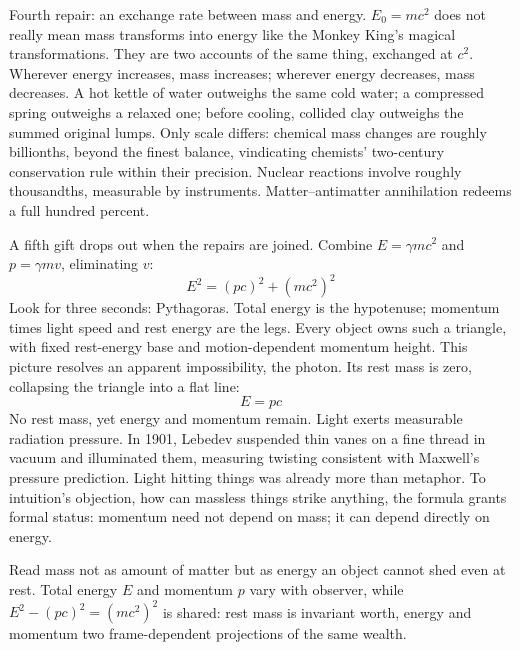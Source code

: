 \begin{mainline}
Fourth repair: an exchange rate between mass and energy. \(E_{0}=mc^{2}\) does not really mean mass transforms into energy like the Monkey King's magical transformations. They are two accounts of the same thing, exchanged at \(c^{2}\). Wherever energy increases, mass increases; wherever energy decreases, mass decreases. A hot kettle of water outweighs the same cold water; a compressed spring outweighs a relaxed one; before cooling, collided clay outweighs the summed original lumps. Only scale differs: chemical mass changes are roughly billionths, beyond the finest balance, vindicating chemists' two-century conservation rule within their precision. Nuclear reactions involve roughly thousandths, measurable by instruments. Matter--antimatter annihilation redeems a full hundred percent.
\end{mainline}

\begin{mainline}
A fifth gift drops out when the repairs are joined. Combine \(E=\gamma mc^{2}\) and \(p=\gamma mv\), eliminating \(v\):
\[
E^{2}=(pc)^{2}+(mc^{2})^{2}
\]
Look for three seconds: Pythagoras. Total energy is the hypotenuse; momentum times light speed and rest energy are the legs. Every object owns such a triangle, with fixed rest-energy base and motion-dependent momentum height. This picture resolves an apparent impossibility, the photon. Its rest mass is zero, collapsing the triangle into a flat line:
\[
E=pc
\]
No rest mass, yet energy and momentum remain. Light exerts measurable radiation pressure. In 1901, Lebedev suspended thin vanes on a fine thread in vacuum and illuminated them, measuring twisting consistent with Maxwell's pressure prediction. Light hitting things was already more than metaphor. To intuition's objection, how can massless things strike anything, the formula grants formal status: momentum need not depend on mass; it can depend directly on energy.
\end{mainline}


\begin{oneline}
Read mass not as amount of matter but as energy an object cannot shed even at rest. Total energy \(E\) and momentum \(p\) vary with observer, while \(E^{2}-(pc)^{2}=(mc^{2})^{2}\) is shared: rest mass is invariant worth, energy and momentum two frame-dependent projections of the same wealth.
\end{oneline}


